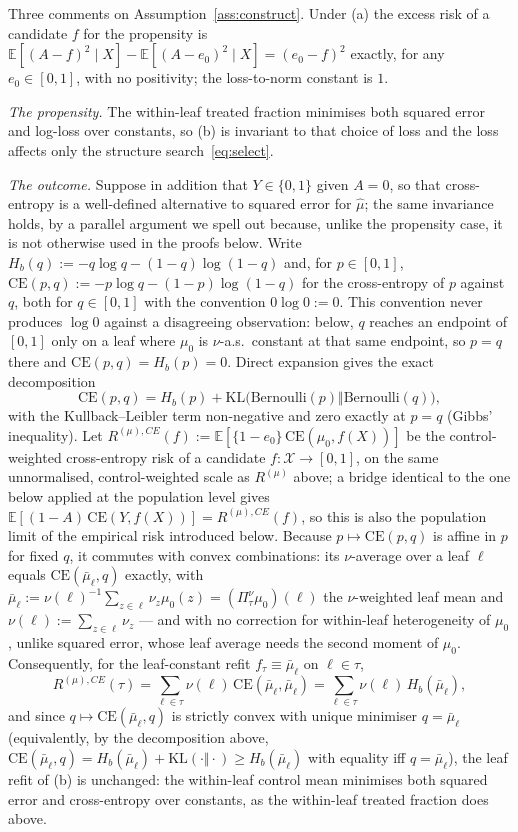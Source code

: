 \documentclass[11pt]{article}
\theoremstyle{plain}
\theoremstyle{definition}
\theoremstyle{remark}
\newcommand{\E}{\mathbb{E}}
\newcommand{\cX}{\mathcal{X}}
\newcommand{\ez}{e_0}
\newcommand{\mz}{\mu_0}
\newcommand{\mhat}{\widehat{\mu}}
\begin{document}
\noindent Three comments on Assumption~\ref{ass:construct}. Under (a) the
excess risk of a candidate $f$ for the propensity is
$\E[(A-f)^2\mid X]-\E[(A-\ez)^2\mid X]=(\ez-f)^2$ exactly, for any
$\ez\in[0,1]$, with no positivity; the loss-to-norm constant is $1$.

\emph{The propensity.} The within-leaf treated fraction minimises both squared
error and log-loss over constants, so (b) is invariant to that choice of loss
and the loss affects only the structure search~\eqref{eq:select}.

\emph{The outcome.} Suppose in addition that $Y\in\{0,1\}$ given $A=0$, so
that cross-entropy is a well-defined alternative to squared error for
$\mhat$; the same invariance holds, by a parallel argument we spell out
because, unlike the propensity case, it is not otherwise used in the proofs
below. Write $H_b(q):=-q\log q-(1-q)\log(1-q)$ and, for $p\in[0,1]$,
$\mathrm{CE}(p,q):=-p\log q-(1-p)\log(1-q)$ for the cross-entropy of $p$
against $q$, both for $q\in[0,1]$ with the convention $0\log0:=0$. This
convention never produces $\log0$ against a disagreeing observation: below,
$q$ reaches an endpoint of $[0,1]$ only on a leaf where $\mz$ is
$\nu$-a.s.\ constant at that same endpoint, so $p=q$ there and
$\mathrm{CE}(p,q)=H_b(p)=0$. Direct expansion gives the exact decomposition
\[
  \mathrm{CE}(p,q)=H_b(p)+\mathrm{KL}\bigl(\mathrm{Bernoulli}(p)\Vert
  \mathrm{Bernoulli}(q)\bigr),
\]
with the Kullback--Leibler term non-negative and zero exactly at $p=q$
(Gibbs' inequality). Let
$R^{(\mu),CE}(f):=\E[\{1-\ez\}\,\mathrm{CE}(\mz,f(X))]$ be the
control-weighted cross-entropy risk of a candidate $f:\cX\to[0,1]$, on the
same unnormalised, control-weighted scale as $R^{(\mu)}$ above; a bridge
identical to the one below applied at the population level gives
$\E[(1-A)\,\mathrm{CE}(Y,f(X))]=R^{(\mu),CE}(f)$, so this is also the
population limit of the empirical risk introduced below. Because
$p\mapsto\mathrm{CE}(p,q)$ is affine in $p$ for fixed $q$, it commutes with
convex combinations: its $\nu$-average over a leaf $\ell$ equals
$\mathrm{CE}(\bar\mu_\ell,q)$ exactly, with
$\bar\mu_\ell:=\nu(\ell)^{-1}\sum_{z\in\ell}\nu_z\mz(z)=(\Pi^\nu_\tau\mz)(\ell)$
the $\nu$-weighted leaf mean and $\nu(\ell):=\sum_{z\in\ell}\nu_z$ --- and
with no correction for within-leaf heterogeneity of $\mz$, unlike squared
error, whose leaf average needs the second moment of $\mz$. Consequently, for
the leaf-constant refit $f_\tau\equiv\bar\mu_\ell$ on $\ell\in\tau$,
\[
  R^{(\mu),CE}(\tau)=\sum_{\ell\in\tau}\nu(\ell)\,
  \mathrm{CE}(\bar\mu_\ell,\bar\mu_\ell)
  =\sum_{\ell\in\tau}\nu(\ell)\,H_b(\bar\mu_\ell),
\]
and since $q\mapsto\mathrm{CE}(\bar\mu_\ell,q)$ is strictly convex with
unique minimiser $q=\bar\mu_\ell$ (equivalently, by the decomposition above,
$\mathrm{CE}(\bar\mu_\ell,q)=H_b(\bar\mu_\ell)+\mathrm{KL}(\cdot\Vert\cdot)\ge
H_b(\bar\mu_\ell)$ with equality iff $q=\bar\mu_\ell$), the leaf refit of (b)
is unchanged: the within-leaf control mean minimises both squared error and
cross-entropy over constants, as the within-leaf treated fraction does above.
\end{document}
